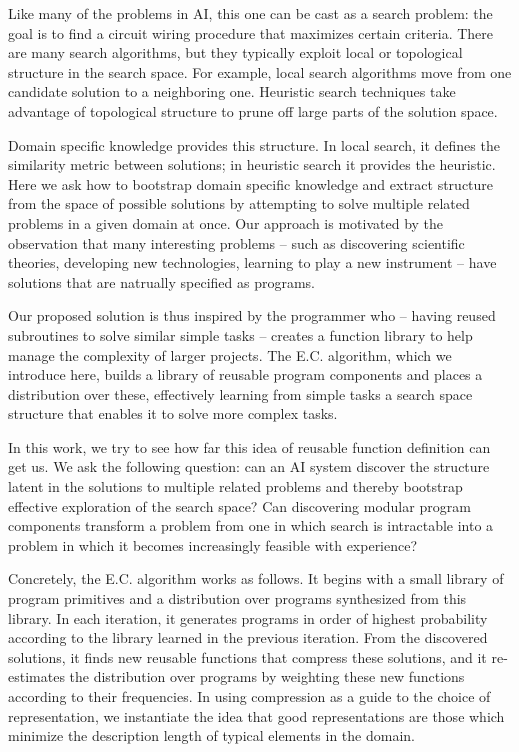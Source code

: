 \documentclass{article}
\begin{document}
Like many of the problems in AI, this one can be cast as a search
problem: the goal is to find a circuit wiring procedure that maximizes
certain criteria.  There are many search algorithms, but they typically
exploit local or topological structure in the search space. For
example, local search algorithms move from one candidate solution to a
neighboring one. Heuristic search techniques take advantage of
topological structure to prune off large parts of the solution space.

Domain specific knowledge provides this structure. In local search, it
defines the similarity metric between solutions; in heuristic search
it provides the heuristic. Here we ask how to bootstrap domain
specific knowledge and extract structure from the space of possible
solutions by attempting to solve multiple related problems in a given
domain at once. Our approach is motivated by the observation that many
interesting problems -- such as discovering scientific theories,
developing new technologies, learning to play a new instrument -- have
solutions that are natrually specified as programs.

Our proposed solution is thus inspired by the programmer who -- having
reused subroutines to solve similar simple tasks -- creates a function
library to help manage the complexity of larger projects. The
E.C. algorithm, which we introduce here, builds a library of reusable
program components and places a distribution over these, effectively
learning from simple tasks a search space structure that enables it to
solve more complex tasks.

In this work, we try to see how far this idea of reusable function
definition can get us. We ask the following question: can an AI system
discover the structure latent in the solutions to multiple related
problems and thereby bootstrap effective exploration of the search
space? Can discovering modular program components transform a problem
from one in which search is intractable into a problem in which it
becomes increasingly feasible with experience?

Concretely, the E.C. algorithm works as follows. It begins with a small
library of program primitives and a distribution over programs
synthesized from this library. In each iteration, it generates
programs in order of highest probability according to the library
learned in the previous iteration. From the discovered solutions, it
finds new reusable functions that compress these solutions, and it
re-estimates the distribution over programs by weighting these new
functions according to their frequencies. In using compression as a
guide to the choice of representation, we instantiate the idea that
good representations are those which minimize the description length
of typical elements in the domain.
\end{document}
